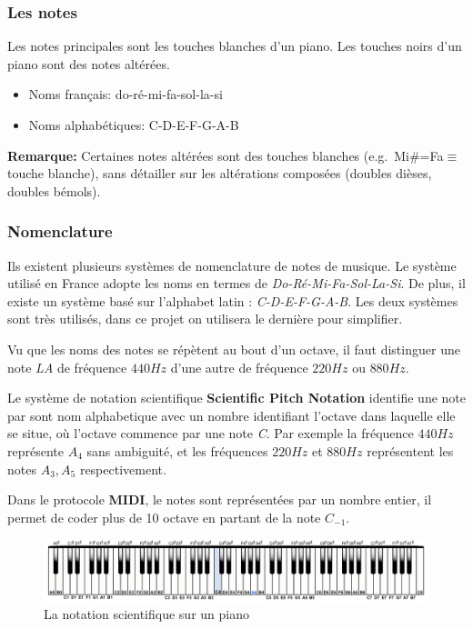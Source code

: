 \documentclass[]{article}
\providecommand{\tightlist}{%
  \setlength{\itemsep}{0pt}\setlength{\parskip}{0pt}}
\begin{document}
\hypertarget{les-notes}{%
\subsubsection{Les notes}\label{les-notes}}

Les notes principales sont les touches blanches d'un piano. Les touches
noirs d'un piano sont des notes altérées.

\begin{itemize}
\tightlist
\item
  Noms français: do-ré-mi-fa-sol-la-si
\item
  Noms alphabétiques: C-D-E-F-G-A-B
\end{itemize}

\textbf{Remarque:} Certaines notes altérées sont des touches blanches
(e.g.~Mi\#=Fa\(\equiv\)touche blanche), sans détailler sur les
altérations composées (doubles dièses, doubles bémols).

\hypertarget{nomenclature}{%
\subsubsection{Nomenclature}\label{nomenclature}}

Ils existent plusieurs systèmes de nomenclature de notes de musique. Le
système utilisé en France adopte les noms en termes de
\emph{Do-Ré-Mi-Fa-Sol-La-Si}. De plus, il existe un système basé sur
l'alphabet latin : \emph{C-D-E-F-G-A-B}. Les deux systèmes sont très
utilisés, dans ce projet on utilisera le dernière pour simplifier.

Vu que les noms des notes se répètent au bout d'un octave, il faut
distinguer une note \emph{LA} de fréquence \(440Hz\) d'une autre de
fréquence \(220Hz\) ou \(880Hz\).

Le système de notation scientifique \textbf{Scientific Pitch Notation}
identifie une note par sont nom alphabetique avec un nombre identifiant
l'octave dans laquelle elle se situe, où l'octave commence par une note
\emph{C}. Par exemple la fréquence \(440Hz\) représente \(A_4\) sans
ambiguité, et les fréquences \(220Hz\) et \(880Hz\) représentent les
notes \(A_3, A_5\) respectivement.

Dans le protocole \textbf{MIDI}, le notes sont représentées par un
nombre entier, il permet de coder plus de 10 octave en partant de la
note \(C_{-1}\).

\begin{figure}
\centering
\includegraphics[width=1\textwidth,height=\textheight]{img/piano-keys.png}
\caption{La notation scientifique sur un piano}
\end{figure}
\end{document}

